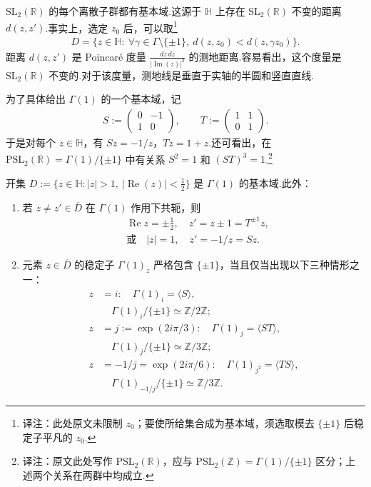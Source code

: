 $\mathrm{SL}_2(\mathbb R)$ 的每个离散子群都有基本域.这源于 $\mathbb H$ 上存在 $\mathrm{SL}_2(\mathbb R)$ 不变的距离 $d(z,z')$.事实上，选定 $z_0$ 后，可以取\footnote{译注：此处原文未限制 $z_0$；要使所给集合成为基本域，须选取模去 $\{\pm1\}$ 后稳定子平凡的 $z_0$.}
\begin{align*}
D=\{z\in\mathbb H:\ \forall\gamma\in\Gamma\setminus\{\pm1\},\ d(z,z_0)<d(z,\gamma z_0)\}.
\end{align*}
距离 $d(z,z')$ 是 Poincaré 度量 $\frac{dz\,d\overline z}{|\operatorname{Im}(z)|^2}$ 的测地距离.容易看出，这个度量是 $\mathrm{SL}_2(\mathbb R)$ 不变的.对于该度量，测地线是垂直于实轴的半圆和竖直直线.

为了具体给出 $\Gamma(1)$ 的一个基本域，记
\begin{align*}
S:=\begin{pmatrix}0&-1\\1&0\end{pmatrix},\qquad T:=\begin{pmatrix}1&1\\0&1\end{pmatrix}.
\end{align*}
于是对每个 $z\in\mathbb H$，有 $Sz=-1/z$，$Tz=1+z$.还可看出，在 $\mathrm{PSL}_2(\mathbb R)=\Gamma(1)/\{\pm1\}$ 中有关系 $S^2=1$ 和 $(ST)^3=1$.\footnote{译注：原文此处写作 $\mathrm{PSL}_2(\mathbb R)$，应与 $\mathrm{PSL}_2(\mathbb Z)=\Gamma(1)/\{\pm1\}$ 区分；上述两个关系在两群中均成立.}

\begin{theorem*}

开集 $D:=\{z\in\mathbb H:|z|>1,\ |\operatorname{Re}(z)|<\frac12\}$ 是 $\Gamma(1)$ 的基本域.此外：

\begin{enumerate}[label=\roman*)]

\item 若 $z\ne z'\in\overline D$ 在 $\Gamma(1)$ 作用下共轭，则
\begin{align*}
&\operatorname{Re}z=\pm\tfrac12,\quad z'=z\pm1=T^{\pm1}z,\\
&\text{或}\quad |z|=1,\quad z'=-1/z=Sz.
\end{align*}
\item 元素 $z\in\overline D$ 的稳定子 $\Gamma(1)_z$ 严格包含 $\{\pm1\}$，当且仅当出现以下三种情形之一：
\begin{align*}
z&=i:\quad \Gamma(1)_i=\langle S\rangle,\\
&\hspace{1em}\Gamma(1)_i/\{\pm1\}\simeq\mathbb Z/2\mathbb Z;\\
z&=j:=\exp(2i\pi/3):\quad \Gamma(1)_j=\langle ST\rangle,\\
&\hspace{1em}\Gamma(1)_j/\{\pm1\}\simeq\mathbb Z/3\mathbb Z;\\
z&=-1/j=\exp(2i\pi/6):\quad \Gamma(1)_{j^2}=\langle TS\rangle,\\
&\hspace{1em}\Gamma(1)_{-1/j}/\{\pm1\}\simeq\mathbb Z/3\mathbb Z.
\end{align*}
\end{enumerate}

\end{theorem*}


